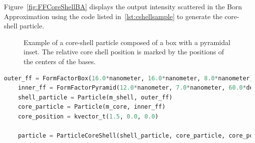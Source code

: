 Figure~\ref{fig:FFCoreShellBA} displays the output intensity scattered in the Born Approximation using the code listed in~\ref{lst:cshellsample} to generate the core-shell particle. 

\begin{figure}[ht]
\hfill
{}
\hfill
{}
\hfill
\caption{Example of a core-shell particle composed of a box with a pyramidal  inset. The relative core shell position is marked by the positions of the centers of the bases. }
\label{fig:coreshell}
\end{figure}

\newpage

\begin{lstlisting}[language=python,
  style=eclipseboxed,numbers=none,nolol,caption={\Code{Python} script
    to create a core-shell particle made of a box with a pyramidal shifted inset.},label={lst:cshellsample}]
    outer_ff = FormFactorBox(16.0*nanometer, 16.0*nanometer, 8.0*nanometer) 
    inner_ff = FormFactorPyramid(12.0*nanometer, 7.0*nanometer, 60.0*degree)
    shell_particle = Particle(m_shell, outer_ff)
    core_particle = Particle(m_core, inner_ff)
    core_position = kvector_t(1.5, 0.0, 0.0)

    particle = ParticleCoreShell(shell_particle, core_particle, core_position)
\end{lstlisting}

